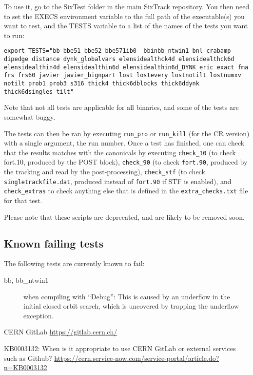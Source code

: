 \documentclass[english,BCOR=0mm,DIV=18]{scrartcl}
\begin{document}
To use it, go to the SixTest folder in the main SixTrack repository.
You then need to set the EXECS environment variable to the full path of the executable(s) you want to test, and the TESTS variable to a list of the names of the tests you want to run:
\begin{lstlisting}
export TESTS="bb bbe51 bbe52 bbe571ib0  bbinbb_ntwin1 bnl crabamp dipedge distance dynk_globalvars elensidealthck4d elensidealthck6d elensidealthin4d elensidealthin6d elensidealthin6d_DYNK eric exact fma frs frs60 javier javier_bignpart lost lostevery lostnotilt lostnumxv notilt prob1 prob3 s316 thick4 thick6dblocks thick6ddynk thick6dsingles tilt"
\end{lstlisting}
Note that not all tests are applicable for all binaries, and some of the tests are somewhat buggy.

The tests can then be ran by executing \texttt{run\_pro} or \texttt{run\_kill} (for the CR version) with a single argument, the run number.
Once a test has finished, one can check that the results matches with the canonicals by executing \texttt{check\_10} (to check fort.10, produced by the POST block), \texttt{check\_90} (to check \texttt{fort.90}, produced by the tracking and read by the post-processing), \texttt{check\_stf} (to check \texttt{singletrackfile.dat}, produced instead of \texttt{fort.90} if STF is enabled), and \texttt{check\_extras} to check anything else that is defined in the \texttt{extra\_checks.txt} file for that test.

Please note that these scripts are deprecated, and are likely to be removed soon.

\subsection{Known failing tests}
The following tests are currently known to fail:
\begin{description}
\item[bb, bb\_ntwin1] when compiling with ``Debug'': This is caused by an underflow in the initial closed orbit search, which is uncovered by trapping the underflow exception.
\end{description}

\begin{thebibliography}{2}

 CERN GitLab \url{https://gitlab.cern.ch/}

 KB0003132: When is it appropriate to use CERN GitLab or external services such as Github? \url{https://cern.service-now.com/service-portal/article.do?n=KB0003132}

\end{thebibliography}
\end{document}
